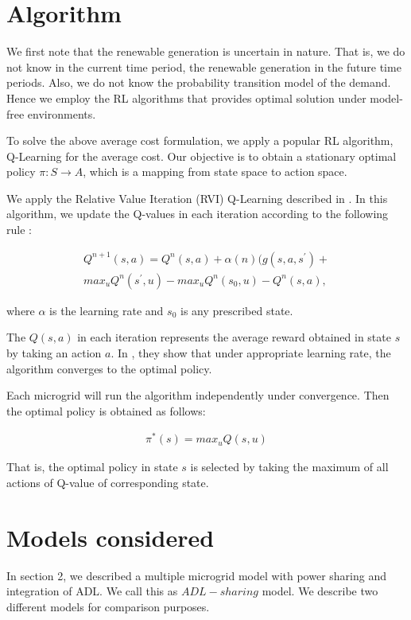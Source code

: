\section{Algorithm}
We first note that the renewable generation is uncertain in nature. That is, we do not know in the current time period, the renewable generation in the future time periods. Also, we do not know the probability transition model of the demand. Hence we employ the RL algorithms that provides optimal solution under model-free environments.

To solve the above average cost formulation, we apply a popular RL algorithm, Q-Learning for the average cost. Our objective is to obtain a stationary optimal policy $\pi : S \rightarrow A$, which is a mapping from state space to action space.  

We apply the Relative Value Iteration (RVI) Q-Learning described in \cite{avgcost}. In this algorithm, we update the Q-values in each iteration according to the following rule :

\begin{align}
Q^{n+1}(s,a) = Q^{n}(s,a) + \alpha(n)(g(s,a,s^{'}) + \\ max_{u} Q^{n}(s^{'},u) - max_{u} Q^{n}(s_{0},u) - Q^{n}(s,a),
\end{align}

where $\alpha$ is the learning rate and $s_{0}$ is any prescribed state.

The $Q(s,a)$ in each iteration represents the average reward obtained in state $s$ by taking an action $a$. In \cite{avgcost}, they show that under appropriate learning rate, the algorithm converges to the  optimal policy. 

Each microgrid will run the algorithm independently under convergence. Then the optimal policy is obtained as follows:

\begin{align}
\pi^{*}(s) = max_{u}Q(s,u)
\end{align}

That is, the optimal policy in state $s$ is selected by taking the maximum of all actions of Q-value of corresponding state. 

\section{Models considered}

In section 2, we described a multiple microgrid model with power sharing and integration of ADL. We call this as $ADL-sharing$ model. We describe two different models for comparison purposes. 

